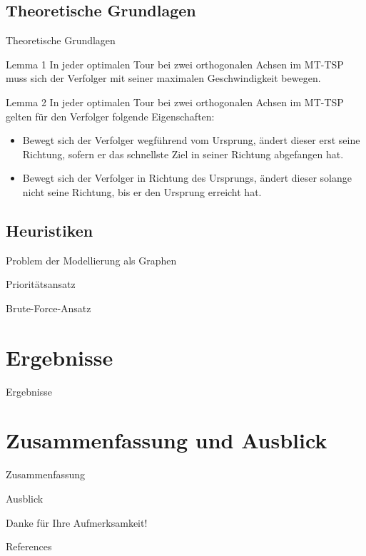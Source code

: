 \documentclass[10pt,table]{beamer}
\begin{document}
\subsection{Theoretische Grundlagen}
\begin{frame}{Theoretische Grundlagen}
\begin{block}{Lemma 1}
In jeder optimalen Tour bei zwei orthogonalen Achsen im MT-TSP muss sich der Verfolger mit seiner  maximalen Geschwindigkeit bewegen.
\end{block}
\begin{block}{Lemma 2}
In jeder optimalen Tour bei zwei orthogonalen Achsen im MT-TSP gelten für den Verfolger folgende Eigenschaften:
\begin{itemize}
\item
Bewegt sich der Verfolger wegführend vom Ursprung, ändert dieser erst seine Richtung, sofern er das schnellste Ziel in seiner Richtung abgefangen hat.
\item
Bewegt sich der Verfolger in Richtung des Ursprungs, ändert dieser solange nicht seine Richtung, bis er den Ursprung erreicht hat.
\end{itemize}
\end{block}
\end{frame}


\subsection{Heuristiken}
\begin{frame}{Problem der Modellierung als Graphen}

\end{frame}

\begin{frame}{Prioritätsansatz}

\end{frame}

\begin{frame}{Brute-Force-Ansatz}

\end{frame}

\section{Ergebnisse}
\begin{frame}{Ergebnisse}

\end{frame}

\section{Zusammenfassung und Ausblick}
\begin{frame}{Zusammenfassung}
    
\end{frame}

\begin{frame}{Ausblick}

\end{frame}




\nocite{*}
\appendix
\begin{frame}
\Large\center
Danke für Ihre Aufmerksamkeit!
\end{frame}


\begin{frame}{References} 
	
	
\end{frame}
\end{document}
